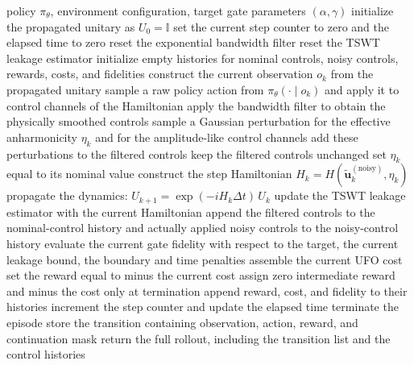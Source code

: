 \begin{algorithm}[H]
\caption{Detailed stochastic rollout generation for noise-optimized RL training}
\label{alg:stochastic_rollout_appendix}
\begin{algorithmic}[1]
\Require policy $\pi_\theta$, environment configuration, target gate parameters $(\alpha,\gamma)$
\State initialize the propagated unitary as $U_0=\mathbb{I}$
\State set the current step counter to zero and the elapsed time to zero
\State reset the exponential bandwidth filter
\State reset the TSWT leakage estimator
\State initialize empty histories for nominal controls, noisy controls, rewards, costs, and fidelities
    \State construct the current observation $o_k$ from the propagated unitary 
    \State sample a raw policy action from $\pi_\theta(\cdot\mid o_k)$ and apply it to control channels of the Hamiltonian
    \State apply the bandwidth filter to obtain the physically smoothed controls
        \State sample a Gaussian perturbation for the effective anharmonicity $\eta_k$ and for the amplitude-like control channels
        \State add these perturbations to the filtered controls
    \Else
        \State keep the filtered controls unchanged
        \State set $\eta_k$ equal to its nominal value
    \EndIf
    \State construct the step Hamiltonian $H_k = H(\tilde{\bm u}_k^{(\mathrm{noisy})},\eta_k)$
    \State propagate the dynamics:
    \(
    U_{k+1}=\exp(-iH_k\Delta t)\,U_k
    \)
    \State update the TSWT leakage estimator with the current Hamiltonian
    \State append the filtered controls to the nominal-control history and actually applied noisy controls to the noisy-control history
    \State evaluate the current gate fidelity with respect to the target, the current leakage bound, the boundary and time penalties
    \State assemble the current UFO cost
        \State set the reward equal to minus the current cost
    \Else
        \State assign zero intermediate reward and minus the cost only at termination
    \EndIf
    \State append reward, cost, and fidelity to their histories
    \State increment the step counter and update the elapsed time
        \State terminate the episode
    \EndIf
    \State store the transition containing observation, action, reward, and continuation mask
\EndWhile
\State return the full rollout, including the transition list and the control histories
\end{algorithmic}
\end{algorithm}